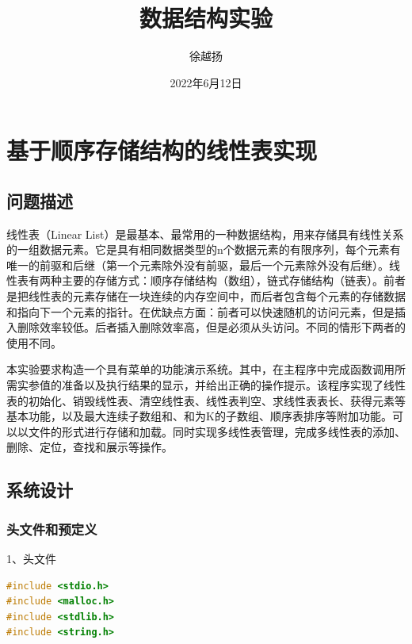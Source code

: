 \documentclass[supercite]{Experimental_Report}
\title{~~~~~~数据结构实验~~~~~~}
\author{徐越扬}
\date{2022年6月12日}
\theoremstyle{definition}
\begin{document}
\maketitle

\clearpage


\tableofcontents[level=2]

\clearpage


\section{基于顺序存储结构的线性表实现}

\subsection{问题描述}

线性表（Linear List）是最基本、最常用的一种数据结构，用来存储具有线性关系的一组数据元素。它是具有相同数据类型的n个数据元素的有限序列，每个元素有唯一的前驱和后继（第一个元素除外没有前驱，最后一个元素除外没有后继）。线性表有两种主要的存储方式：顺序存储结构（数组），链式存储结构（链表）。前者是把线性表的元素存储在一块连续的内存空间中，而后者包含每个元素的存储数据和指向下一个元素的指针。在优缺点方面：前者可以快速随机的访问元素，但是插入删除效率较低。后者插入删除效率高，但是必须从头访问。不同的情形下两者的使用不同。

本实验要求构造一个具有菜单的功能演示系统。其中，在主程序中完成函数调用所需实参值的准备以及执行结果的显示，并给出正确的操作提示。该程序实现了线性表的初始化、销毁线性表、清空线性表、线性表判空、求线性表表长、获得元素等基本功能，以及最大连续子数组和、和为K的子数组、顺序表排序等附加功能。可以以文件的形式进行存储和加载。同时实现多线性表管理，完成多线性表的添加、删除、定位，查找和展示等操作。

\subsection{系统设计}

\subsubsection{头文件和预定义}

1、头文件

\begin{lstlisting}[language=c]
#include <stdio.h>
#include <malloc.h>
#include <stdlib.h>
#include <string.h>
\end{lstlisting}
\end{document}
